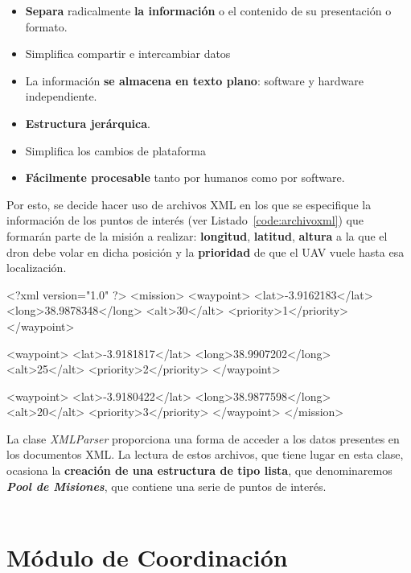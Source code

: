 \begin{itemize}
\item \textbf{Separa} radicalmente \textbf{la información} o el contenido de su presentación o formato.
\item Simplifica compartir e intercambiar datos
\item La información \textbf{se almacena en texto plano}: software y hardware independiente.
\item \textbf{Estructura jerárquica}.
\item Simplifica los cambios de plataforma
\item \textbf{Fácilmente procesable} tanto por humanos como por software.
\end{itemize}

Por esto, se decide hacer uso de archivos XML en los que se especifique la información de los puntos de interés (ver Listado~\ref{code:archivoxml}) que formarán parte de la misión a realizar: \textbf{longitud}, \textbf{latitud}, \textbf{altura} a la que el dron debe volar en dicha posición y la \textbf{prioridad} de que el \acs{UAV} vuele hasta esa localización. 

\begin{listing}[
 float=,
 language = XML,
 caption = {Ejemplo de archivo XML que contiene la información de los «waypoints»},
 label  = code:archivoxml]
<?xml version="1.0" ?>
<mission>
	<waypoint>
 		<lat>-3.9162183</lat>
 		<long>38.9878348</long>
		<alt>30</alt>
		<priority>1</priority>
	</waypoint>

	<waypoint>
 		<lat>-3.9181817</lat>
 		<long>38.9907202</long>
		<alt>25</alt>
		<priority>2</priority>
	</waypoint>

	<waypoint>
 		<lat>-3.9180422</lat>
 		<long>38.9877598</long>
		<alt>20</alt>
		<priority>3</priority>
	</waypoint>
</mission>
\end{listing}

La clase \textit{XMLParser} proporciona una forma de acceder a los datos presentes en los documentos XML. La lectura de estos archivos, que tiene lugar en esta clase, ocasiona la \textbf{creación de una estructura de tipo lista}, que denominaremos \textbf{\textit{Pool de Misiones}}, que contiene una serie de puntos de interés. \\ \\

\section{Módulo de Coordinación}

